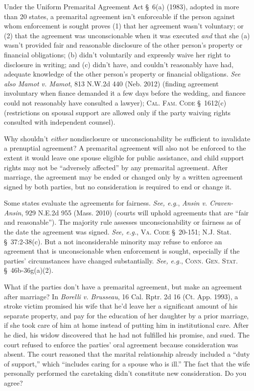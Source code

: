 Under the Uniform Premarital Agreement Act \S~6(a) (1983), adopted in more than
20 states, a premarital agreement isn't enforceable if the person against whom
enforcement is sought proves (1) that her agreement wasn't voluntary; or (2)
that the agreement was unconscionable when it was executed \textit{and} that
she (a) wasn't provided fair and reasonable disclosure of the other person's
property or financial obligations; (b) didn't voluntarily and expressly waive
her right to disclosure in writing; and (c) didn't have, and couldn't
reasonably have had, adequate knowledge of the other person's property or
financial obligations. \textit{See also Mamot v. Mamot}, 813 N.W.2d 440 (Neb.
2012) (finding agreement involuntary when fiance demanded it a few days before
the wedding, and fiancee could not reasonably have consulted a lawyer);
\textsc{Cal. Fam. Code} \S~1612(c) (restrictions on spousal support are allowed
only if the party waiving rights consulted with independent counsel).

Why shouldn't \textit{either} nondisclosure or unconscionability be sufficient
to invalidate a prenuptial agreement? A premarital agreement will also not be
enforced to the extent it would leave one spouse eligible for public
assistance, and child support rights may not be ``adversely affected'' by any
premarital agreement. After marriage, the agreement may be ended or changed
only by a written agreement signed by both parties, but no consideration is
required to end or change it.

Some states evaluate the agreements for fairness. \textit{See, e.g.}, \emph{Ansin v.
Craven-Ansin}, 929 N.E.2d 955 (Mass. 2010) (courts will uphold agreements that
are ``fair and reasonable''). The majority rule assesses unconscionability or
fairness as of the date the agreement was signed. \textit{See, e.g.}, \textsc{Va. Code}
\S~20-151; N.J. Stat. \S~37:2-38(c). But a not inconsiderable minority may
refuse to enforce an agreement that is unconscionable when enforcement is
sought, especially if the parties' circumstances have changed substantially.
\textit{See, e.g.}, \textsc{Conn. Gen. Stat.} \S~46b-36g(a)(2).

\item
What if the parties don't have a premarital agreement, but make an agreement
after marriage? In \textit{Borelli v. Brusseau}, 16 Cal. Rptr. 2d 16 (Ct. App.
1993), a stroke victim promised his wife that he'd leave her a significant
amount of his separate property, and pay for the education of her daughter by a
prior marriage, if she took care of him at home instead of putting him in
institutional care. After he died, his widow discovered that he had not
fulfilled his promise, and sued. The court refused to enforce the parties' oral
agreement because consideration was absent. The court reasoned that the marital
relationship already included a ``duty of support,'' which ``includes caring
for a spouse who is ill.'' The fact that the wife personally performed the
caretaking didn't constitute new consideration. Do you agree?

